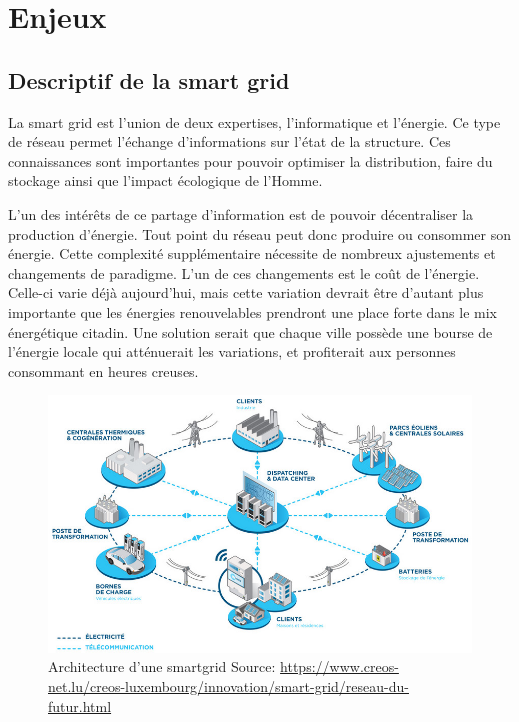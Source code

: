 \chapter{Enjeux}
\section{Descriptif de la smart grid}


La smart grid est l'union de deux expertises, l'informatique et l'énergie.
Ce type de réseau permet l'échange d'informations sur l'état de la structure.
Ces connaissances sont importantes pour pouvoir optimiser la distribution, faire du stockage
ainsi que l'impact écologique de l'Homme.

L'un des intérêts de ce partage d'information est de pouvoir décentraliser la production d'énergie.
Tout point du réseau peut donc produire ou consommer son énergie.
Cette complexité supplémentaire nécessite de nombreux ajustements et changements de paradigme.
L'un de ces changements est le coût de l'énergie. Celle-ci varie déjà aujourd’hui, mais cette variation
devrait être d'autant plus importante que les énergies renouvelables prendront une place forte dans
le mix énergétique citadin. Une solution serait que chaque ville possède une bourse de l'énergie
locale qui atténuerait les variations, et profiterait aux personnes consommant en heures creuses.

\begin{figure}
    \centering
    \includegraphics[scale=0.25]{media/smart_city_lux.jpg}
    \caption{
        Architecture d'une smartgrid\newline
        \tiny{Source: \url{https://www.creos-net.lu/creos-luxembourg/innovation/smart-grid/reseau-du-futur.html}}
    }
\end{figure}

